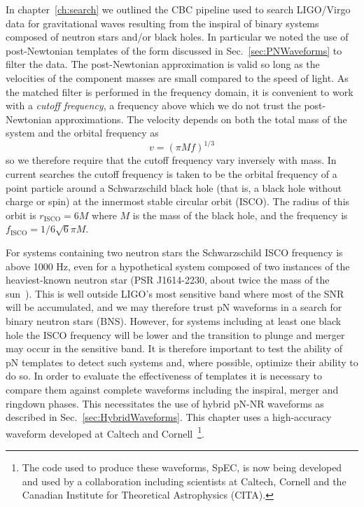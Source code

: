 In chapter~\ref{ch:search} we outlined the CBC pipeline used to search
LIGO/Virgo data for gravitational waves resulting from the inspiral of
binary systems composed of neutron stars and/or black holes.  In
particular we noted the use of post-Newtonian templates of the form
discussed in Sec.~\ref{sec:PNWaveforms} to filter the data.  The
post-Newtonian approximation is valid so long as the velocities of the
component masses are small compared to the speed of light.  As the
matched filter is performed in the frequency domain, it is convenient
to work with a \emph{cutoff frequency}, a frequency above which we do
not trust the post-Newtonian approximations.  The velocity depends on
both the total mass of the system and the orbital frequency as 
%
\begin{equation*}
v=(\pi M f)^{1/3}
\end{equation*}
%
so we therefore require that the cutoff frequency vary inversely with
mass.  In current searches the cutoff frequency is taken to be the
orbital frequency of a point particle around a Schwarzschild black
hole (that is, a black hole without charge or spin) at the innermost
stable circular orbit (ISCO).  The radius of this orbit is
$r_{\textrm{ISCO}}=6M$ where $M$ is the mass of the black hole, and
the frequency is $f_{\textrm{ISCO}}=1/6\sqrt{6}\pi M$.

For systems containing two neutron stars the Schwarzschild ISCO
frequency is above 1000 Hz, even for a hypothetical system composed of
two instances of the heaviest-known neutron star (PSR J1614-2230,
about twice the mass of the sun~\cite{Demorest:2010bx}).  This is well
outside LIGO's most sensitive band where most of the SNR will be
accumulated, and we may therefore trust pN waveforms in a search for
binary neutron stars (BNS).  However, for systems including at least
one black hole the ISCO frequency will be lower and the transition to
plunge and merger may occur in the sensitive band.  It is therefore
important to test the ability of pN templates to detect such systems
and, where possible, optimize their ability to do so.  In order to
evaluate the effectiveness of templates it is necessary to compare
them against complete waveforms including the inspiral, merger and
ringdown phases.  This necessitates the use of hybrid pN-NR waveforms
as described in Sec.~\ref{sec:HybridWaveforms}.  This chapter uses
a high-accuracy waveform developed at Caltech and
Cornell~\footnote{The code used to produce these waveforms, SpEC, is
now being developed and used by a collaboration including scientists
at Caltech, Cornell and the Canadian Institute for Theoretical
Astrophysics (CITA).}. 

